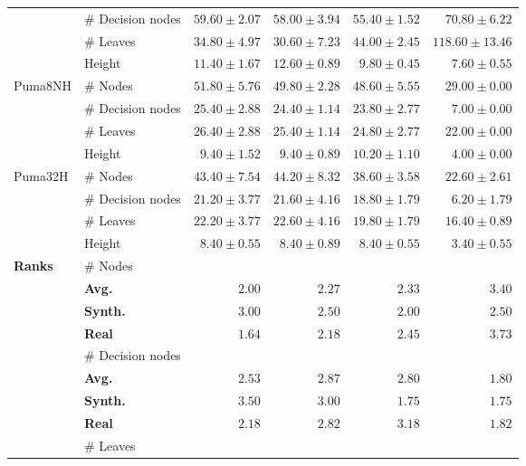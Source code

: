 \begin{table*}[!htbp]
{\begin{tabular}{llrrrr}
		  & \# Decision nodes & $59.60 \pm 2.07$ & $58.00 \pm 3.94$ & $\mathbf{55.40 \pm 1.52}$ & $70.80 \pm 6.22$\\
		  & \# Leaves & $34.80 \pm 4.97$ & $\mathbf{30.60 \pm 7.23}$ & $44.00 \pm 2.45$ & $118.60 \pm 13.46$\\
		  & Height & $11.40 \pm 1.67$ & $12.60 \pm 0.89$ & $9.80 \pm 0.45$ & $\mathbf{7.60 \pm 0.55}$\\
		\midrule
		\multirow{4}{*}{Puma8NH} & \# Nodes & $51.80 \pm 5.76$ & $49.80 \pm 2.28$ & $48.60 \pm 5.55$ & $\mathbf{29.00 \pm 0.00}$\\
		  & \# Decision nodes & $25.40 \pm 2.88$ & $24.40 \pm 1.14$ & $23.80 \pm 2.77$ & $\mathbf{7.00 \pm 0.00}$\\
		  & \# Leaves & $26.40 \pm 2.88$ & $25.40 \pm 1.14$ & $24.80 \pm 2.77$ & $\mathbf{22.00 \pm 0.00}$\\
		  & Height & $9.40 \pm 1.52$ & $9.40 \pm 0.89$ & $10.20 \pm 1.10$ & $\mathbf{4.00 \pm 0.00}$\\
		\midrule
		\multirow{4}{*}{Puma32H} & \# Nodes & $43.40 \pm 7.54$ & $44.20 \pm 8.32$ & $38.60 \pm 3.58$ & $\mathbf{22.60 \pm 2.61}$\\
		  & \# Decision nodes & $21.20 \pm 3.77$ & $21.60 \pm 4.16$ & $18.80 \pm 1.79$ & $\mathbf{6.20 \pm 1.79}$\\
		  & \# Leaves & $22.20 \pm 3.77$ & $22.60 \pm 4.16$ & $19.80 \pm 1.79$ & $\mathbf{16.40 \pm 0.89}$\\
		  & Height & $8.40 \pm 0.55$ & $8.40 \pm 0.89$ & $8.40 \pm 0.55$ & $\mathbf{3.40 \pm 0.55}$\\
		\midrule
		\multirow{16}{*}{\textbf{Ranks}}		 & \# Nodes &  &  &  & \\
		 & \qquad\textbf{Avg.} & $\mathbf{2.00}$ & $2.27$ & $2.33$ & $3.40$\\
		 & \qquad\textbf{Synth.} &  $3.00$ &  $2.50$ &  $\mathbf{2.00}$ &  $2.50$\\
		 & \qquad\textbf{Real} &  $\mathbf{1.64}$ & $2.18$ & $2.45$ & $3.73$\\
		\cmidrule{2-6}
		 & \# Decision nodes &  &  &  & \\
		 & \qquad\textbf{Avg.} & $2.53$ & $2.87$ & $2.80$ & $\mathbf{1.80}$\\
		 & \qquad\textbf{Synth.} &  $3.50$ &  $3.00$ &  $\mathbf{1.75}$ &  $1.75$\\
		 & \qquad\textbf{Real} & $2.18$ & $2.82$ & $3.18$ &  $\mathbf{1.82}$\\
		\cmidrule{2-6}
		 & \# Leaves &  &  &  & \\

\end{tabular}}
\end{table*}
